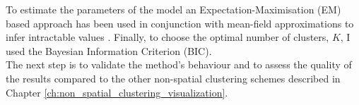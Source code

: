 To estimate the parameters of the model an Expectation-Maximisation (EM) based approach has been used in conjunction with mean-field approximations to infer intractable values \citep{Celeux01}. Finally, to choose the optimal number of clusters, $K$, I used the Bayesian Information Criterion (BIC).\\

The next step is to validate the method's behaviour and to assess the quality of the results compared to the other non-spatial clustering schemes described in Chapter \ref{ch:non_spatial_clustering_visualization}.

